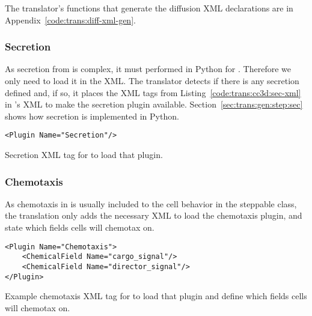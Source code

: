 The translator's functions that generate the diffusion XML declarations are in Appendix~\ref{code:trans:diff-xml-gen}.


\subsubsection{Secretion}\label{sec:trans:gen:xml:sec}
As secretion from \pscs is complex, it must performed in Python for \ccd. Therefore we only need to load it in the XML. The translator detects if there is any secretion defined and, if so, it places the XML tags from Listing~\ref{code:trans:cc3d:sec-xml} in \ccd's XML to make the secretion plugin available. Section~\ref{sec:trans:gen:step:sec} shows how secretion is implemented in Python.
\begin{listing}[H]%
\begin{verbatim}
<Plugin Name="Secretion"/>
\end{verbatim}
\caption{Secretion XML tag for \ccds to load that plugin.}\label{code:trans:cc3d:sec-xml}
\end{listing}

\subsubsection{Chemotaxis}\label{sec:trans:gen:xml:taxis}
As chemotaxis in \ccds is usually included to the cell behavior in the steppable class, the translation only adds the necessary XML to load the chemotaxis plugin, and state which fields cells will chemotax on.
\begin{listing}[H]%
\begin{verbatim}
<Plugin Name="Chemotaxis">
    <ChemicalField Name="cargo_signal"/>
    <ChemicalField Name="director_signal"/>
</Plugin>
\end{verbatim}
\caption{Example chemotaxis XML tag for \ccds to load that plugin and define which fields cells will chemotax on.}\label{code:trans:cc3d:taxis-xml}
\end{listing}

